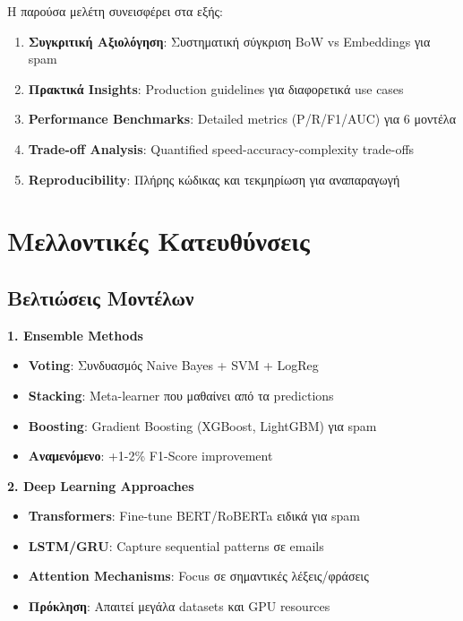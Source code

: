 \documentclass[12pt,a4paper,twoside]{book}
\begin{document}
Η παρούσα μελέτη συνεισφέρει στα εξής:

\begin{enumerate}
    \item \textbf{Συγκριτική Αξιολόγηση}: Συστηματική σύγκριση BoW vs Embeddings για spam
    \item \textbf{Πρακτικά Insights}: Production guidelines για διαφορετικά use cases
    \item \textbf{Performance Benchmarks}: Detailed metrics (P/R/F1/AUC) για 6 μοντέλα
    \item \textbf{Trade-off Analysis}: Quantified speed-accuracy-complexity trade-offs
    \item \textbf{Reproducibility}: Πλήρης κώδικας και τεκμηρίωση για αναπαραγωγή
\end{enumerate}

\section{Μελλοντικές Κατευθύνσεις}

\subsection{Βελτιώσεις Μοντέλων}

\textbf{1. Ensemble Methods}

\begin{itemize}
    \item \textbf{Voting}: Συνδυασμός Naive Bayes + SVM + LogReg
    \item \textbf{Stacking}: Meta-learner που μαθαίνει από τα predictions
    \item \textbf{Boosting}: Gradient Boosting (XGBoost, LightGBM) για spam
    \item \textbf{Αναμενόμενο}: +1-2\% F1-Score improvement
\end{itemize}

\textbf{2. Deep Learning Approaches}

\begin{itemize}
    \item \textbf{Transformers}: Fine-tune BERT/RoBERTa ειδικά για spam
    \item \textbf{LSTM/GRU}: Capture sequential patterns σε emails
    \item \textbf{Attention Mechanisms}: Focus σε σημαντικές λέξεις/φράσεις
    \item \textbf{Πρόκληση}: Απαιτεί μεγάλα datasets και GPU resources
\end{itemize}
\end{document}
